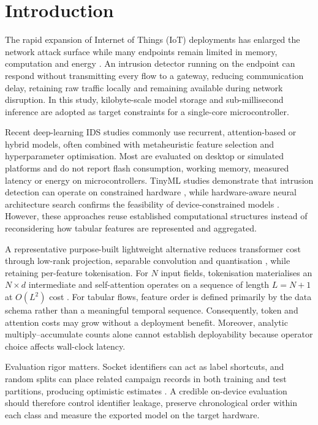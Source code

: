 \documentclass[10pt,letterpaper,twocolumn]{article}
\begin{document}
\section{Introduction}
\label{sec:intro}

The rapid expansion of Internet of Things (IoT) deployments has enlarged the
network attack surface while many endpoints remain limited in memory,
computation and energy \cite{ferrag2020dl}. An intrusion detector running on
the endpoint can respond without transmitting every flow to a gateway,
reducing communication delay, retaining raw traffic locally and remaining
available during network disruption. In this study, kilobyte-scale model
storage and sub-millisecond inference are adopted as target constraints for a
single-core microcontroller.

Recent deep-learning IDS studies commonly use recurrent, attention-based or
hybrid models, often combined with metaheuristic feature selection and
hyperparameter optimisation. Most are evaluated on desktop or simulated platforms and do not
report flash consumption, working memory, measured latency or energy on
microcontrollers. TinyML studies demonstrate that intrusion detection can
operate on constrained hardware \cite{hamdouchi2025tinyml}, while hardware-aware
neural architecture search confirms the feasibility of device-constrained
models \cite{ortizgarces2026nas}. However, these approaches reuse
established computational structures instead of reconsidering how tabular
features are represented and aggregated.

A representative purpose-built lightweight alternative reduces transformer
cost through low-rank projection, separable convolution and quantisation
\cite{wang2024theseus}, while retaining per-feature tokenisation. For $N$ input
fields, tokenisation materialises an $N \times d$ intermediate and
self-attention operates on a sequence of length $L=N+1$ at $O(L^{2})$ cost
\cite{vaswani2017attention}. For tabular flows, feature
order is defined primarily by the data schema rather than a meaningful temporal
sequence. Consequently, token and attention costs may grow without a
deployment benefit. Moreover, analytic multiply--accumulate
counts alone cannot establish deployability because operator choice affects
wall-clock latency.

Evaluation rigor matters. Socket identifiers can act as label shortcuts,
and random splits can place related campaign records in both training and test
partitions, producing optimistic estimates \cite{arp2022dos}. A credible
on-device evaluation should therefore control identifier leakage, preserve
chronological order within each class and measure the exported model on the
target hardware.
\end{document}
